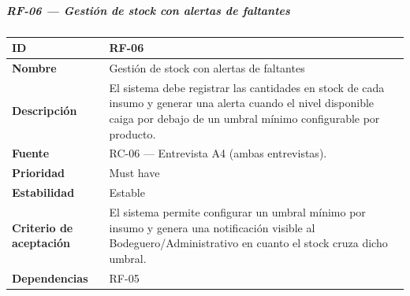 \subparagraph{RF-06 --- Gestión de stock con alertas de
faltantes}\label{rf-06-gestiuxf3n-de-stock-con-alertas-de-faltantes}

{\def\LTcaptype{none} %
\begin{longtable}[]{@{}
  >{\raggedright\arraybackslash}p{}
  >{\raggedright\arraybackslash}p{}@{}}
\toprule\noalign{}
\begin{minipage}[b]{\linewidth}\raggedright
\textbf{ID}
\end{minipage} & \begin{minipage}[b]{\linewidth}\raggedright
RF-06
\end{minipage} \\
\midrule\noalign{}
\endhead
\bottomrule\noalign{}
\endlastfoot
\textbf{Nombre} & \begin{minipage}[t]{\linewidth}\raggedright
Gestión de stock con alertas de faltantes
\end{minipage} \\
\textbf{Descripción} & \begin{minipage}[t]{\linewidth}\raggedright
El sistema debe registrar las cantidades en stock de cada insumo y
generar una alerta cuando el nivel disponible caiga por debajo de un
umbral mínimo configurable por producto.
\end{minipage} \\
\textbf{Fuente} & \begin{minipage}[t]{\linewidth}\raggedright
RC-06 --- Entrevista A4 (ambas entrevistas).
\end{minipage} \\
\textbf{Prioridad} & \begin{minipage}[t]{\linewidth}\raggedright
Must have
\end{minipage} \\
\textbf{Estabilidad} & \begin{minipage}[t]{\linewidth}\raggedright
Estable
\end{minipage} \\
\textbf{Criterio de aceptación} &
\begin{minipage}[t]{\linewidth}\raggedright
El sistema permite configurar un umbral mínimo por insumo y genera una
notificación visible al Bodeguero/Administrativo en cuanto el stock
cruza dicho umbral.
\end{minipage} \\
\textbf{Dependencias} & \begin{minipage}[t]{\linewidth}\raggedright
RF-05
\end{minipage} \\
\end{longtable}
}


